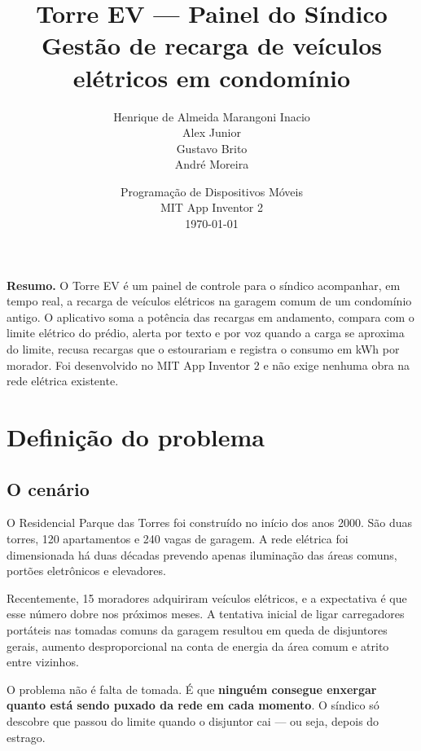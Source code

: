 \documentclass[12pt,a4paper]{article}
\title{\vspace{-1.5cm}\textbf{Torre EV --- Painel do Síndico}\\[0.3cm]
\large Gestão de recarga de veículos elétricos em condomínio}
\author{
Henrique de Almeida Marangoni Inacio \\
Alex Junior \\
Gustavo Brito \\
André Moreira
}
\date{Programação de Dispositivos Móveis \\ MIT App Inventor 2 \\[0.3cm] \today}
\begin{document}
\maketitle
\thispagestyle{empty}

\begin{center}
\begin{minipage}{0.85\textwidth}
\small
\textbf{Resumo.} O Torre EV é um painel de controle para o síndico acompanhar, em tempo
real, a recarga de veículos elétricos na garagem comum de um condomínio antigo. O
aplicativo soma a potência das recargas em andamento, compara com o limite elétrico do
prédio, alerta por texto e por voz quando a carga se aproxima do limite, recusa recargas
que o estourariam e registra o consumo em kWh por morador. Foi desenvolvido no MIT App
Inventor 2 e não exige nenhuma obra na rede elétrica existente.
\end{minipage}
\end{center}

\vspace{0.8cm}
\tableofcontents
\newpage

\section{Definição do problema}

\subsection{O cenário}

O Residencial Parque das Torres foi construído no início dos anos 2000. São duas torres,
120 apartamentos e 240 vagas de garagem. A rede elétrica foi dimensionada há duas décadas
prevendo apenas iluminação das áreas comuns, portões eletrônicos e elevadores.

Recentemente, 15 moradores adquiriram veículos elétricos, e a expectativa é que esse
número dobre nos próximos meses. A tentativa inicial de ligar carregadores portáteis nas
tomadas comuns da garagem resultou em queda de disjuntores gerais, aumento
desproporcional na conta de energia da área comum e atrito entre vizinhos.

O problema não é falta de tomada. É que \textbf{ninguém consegue enxergar quanto está
sendo puxado da rede em cada momento}. O síndico só descobre que passou do limite quando
o disjuntor cai --- ou seja, depois do estrago.
\end{document}
